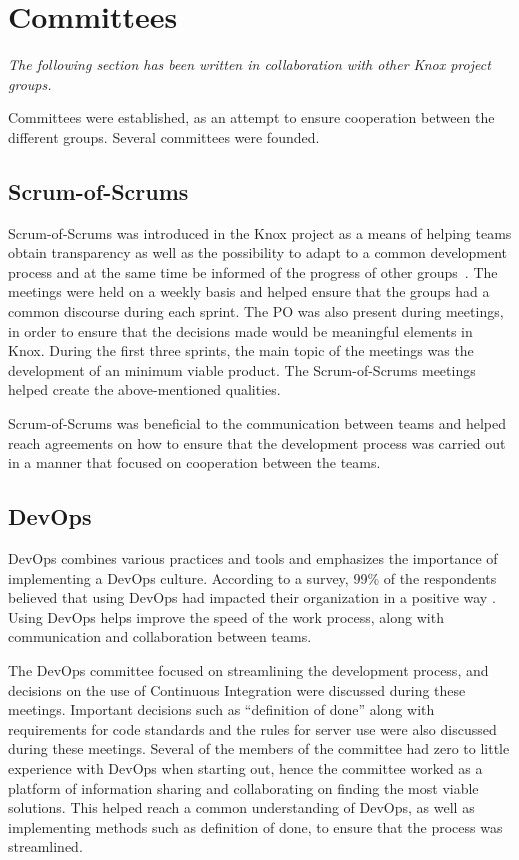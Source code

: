 \section{Committees}\label{SHARED-committees}
\textit{The following section has been written in collaboration with other Knox project groups.}

Committees were established, as an attempt to ensure cooperation between the different groups. Several committees were founded.

\subsection{Scrum-of-Scrums}
Scrum-of-Scrums was introduced in the Knox project as a means of helping teams obtain transparency as well as the possibility to adapt to a common development process and at the same time be informed of the progress of other groups\ \cite{agile}.
The meetings were held on a weekly basis and helped ensure that the groups had a common discourse during each sprint. 
The PO was also present during meetings, in order to ensure that the decisions made would be meaningful elements in Knox. 
During the first three sprints, the main topic of the meetings was the development of an minimum viable product.
The Scrum-of-Scrums meetings helped create the above-mentioned qualities.

Scrum-of-Scrums was beneficial to the communication between teams and helped reach agreements on how to ensure that the development process was carried out in a manner that focused on cooperation between the teams.

\subsection{DevOps}
DevOps combines various practices and tools and emphasizes the importance of implementing a DevOps culture. According to a survey, 99\% of the respondents believed that using DevOps had impacted their organization in a positive way \cite{Atlassian}. Using DevOps helps improve the speed of the work process, along with communication and collaboration between teams.

The DevOps committee focused on streamlining the development process, and decisions on the use of Continuous Integration were discussed during these meetings. 
Important decisions such as “definition of done” along with requirements for code standards and the rules for server use were also discussed during these meetings.
Several of the members of the committee had zero to little experience with DevOps when starting out, hence the committee worked as a platform of information sharing and collaborating on finding the most viable solutions. This helped reach a common understanding of DevOps, as well as implementing methods such as definition of done, to ensure that the process was streamlined.

